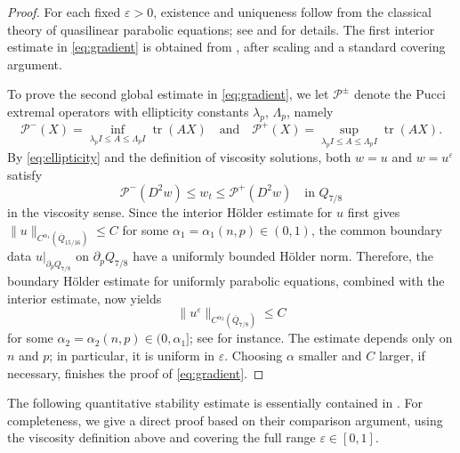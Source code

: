 \documentclass[a4paper,11pt]{amsart}
\theoremstyle{plain}
\theoremstyle{definition}
\numberwithin{equation}{section}
\begin{document}
\begin{proof}
For each fixed $\varepsilon>0$, existence and uniqueness follow from the classical theory of quasilinear parabolic equations; see \cite[Chapter~VI, Theorem~4.4]{LSU68} and \cite[Lemma~5.1]{JS17} for details. The first interior estimate in \eqref{eq:gradient} is obtained from \cite[Theorem~4.5]{JS17}, after scaling and a standard covering argument.

To prove the second global estimate in \eqref{eq:gradient}, we let $\mathcal P^\pm$ denote the Pucci extremal operators with ellipticity constants $\lambda_p$, $\Lambda_p$, namely
\begin{equation*}
 \mathcal P^-(X)=\inf_{\lambda_p I\leq A\leq\Lambda_p I}\operatorname{tr}(AX)
 \quad \text{and} \quad
 \mathcal P^+(X)=\sup_{\lambda_p I\leq A\leq\Lambda_p I}\operatorname{tr}(AX).
\end{equation*}
By \eqref{eq:ellipticity} and the definition of viscosity solutions, both $w=u$ and $w=u^\varepsilon$ satisfy
\begin{equation*}
 \mathcal P^-(D^2w)\leq w_t\leq\mathcal P^+(D^2w)
 \quad\text{in $Q_{7/8}$}
\end{equation*}
in the viscosity sense. Since the interior H\"older estimate for $u$ first gives $\|u\|_{C^{\alpha_1}(\overline{Q}_{15/16})}\leq C$ for some $\alpha_1=\alpha_1(n,p)\in(0,1)$, the common boundary data $u|_{\partial_pQ_{7/8}}$ on $\partial_pQ_{7/8}$ have a uniformly bounded H\"older norm. Therefore, the boundary H\"older estimate for uniformly parabolic equations, combined with the interior estimate, now yields
\begin{equation*}
 \|u^\varepsilon\|_{C^{\alpha_2}(\overline{Q}_{7/8})}\leq C
\end{equation*}
for some $\alpha_2=\alpha_2(n,p)\in(0,\alpha_1]$; see \cite{Lie96, Wan92a,Wan92b} for instance. The estimate depends only on $n$ and $p$; in particular, it is uniform in $\varepsilon$. Choosing $\alpha$ smaller and $C$ larger, if necessary, finishes the proof of \eqref{eq:gradient}.
\end{proof}

The following quantitative stability estimate is essentially contained in \cite[Theorem~4.7(1)]{KL26}. For completeness, we give a direct proof based on their comparison argument, using the viscosity definition above and covering the full range $\varepsilon\in[0,1]$.
\end{document}
